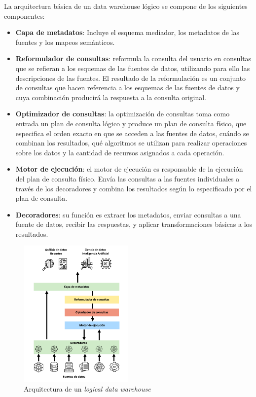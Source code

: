 La arquitectura básica de un data warehouse lógico se compone de los siguientes componentes:

\begin{itemize}
    \item \textbf{Capa de metadatos}: Incluye el esquema mediador, los metadatos de las fuentes y los mapeos semánticos.
    \item \textbf{Reformulador de consultas}: reformula la consulta del usuario en consultas que se refieran a los esquemas de las fuentes de datos, utilizando para ello las descripciones de las fuentes. El resultado de la reformulación es un conjunto de consultas que hacen referencia a los esquemas de las fuentes de datos y cuya combinación producirá la respuesta a la consulta original.
    \item \textbf{Optimizador de consultas}:  la optimización de consultas toma como entrada un plan de consulta lógico y produce un plan de consulta físico, que especifica el orden exacto en que se acceden a las fuentes de datos, cuándo se combinan los resultados, qué algoritmos se utilizan para realizar operaciones sobre los datos y la cantidad de recursos asignados a cada operación.
    \item \textbf{Motor de ejecución}: el motor de ejecución es responsable de la ejecución del plan de consulta físico. Envía las consultas a las fuentes individuales a través de los decoradores y combina los resultados según lo especificado por el plan de consulta.
    \item \textbf{Decoradores}: su función es extraer los metadatos, enviar consultas a una fuente de datos, recibir las respuestas, y aplicar transformaciones básicas a los resultados.
    
\end{itemize}

\begin{figure}[h!]
    \centering
    \includegraphics[width=0.5\textwidth]{Images/ldw-architecture.png}
    \caption{Arquitectura de un \textit{logical data warehouse}}
    \label{fig:ldw-architecture}
\end{figure}

